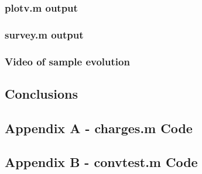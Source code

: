 \documentclass[10pt]{article}
\begin{document}
\subsubsection*{plotv.m output}

\subsubsection*{survey.m output}

\subsubsection*{Video of sample evolution}

\pagebreak

\subsection*{Conclusions}


\pagebreak

\subsection*{Appendix A - charges.m Code}


\pagebreak

\subsection*{Appendix B - convtest.m Code}


\pagebreak

\end{document}
